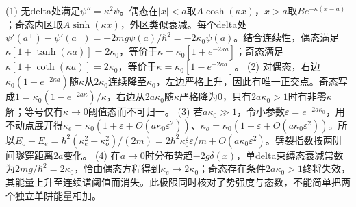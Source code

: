 (1) 无delta处满足\(\psi''=\kappa^2\psi\)。偶态在\(|x|<a\)取\(A\cosh(\kappa x)\)，\(x>a\)取\(Be^{-\kappa(x-a)}\)；奇态内区取\(A\sinh(\kappa x)\)，外区类似衰减。每个delta处\(\psi'(a^+)-\psi'(a^-)=-2mg\psi(a)/\hbar^2=-2\kappa_0\psi(a)\)。结合连续性，偶态满足\(\kappa[1+\tanh(\kappa a)]=2\kappa_0\)，等价于\(\kappa=\kappa_0[1+e^{-2\kappa a}]\)；奇态满足\(\kappa[1+\coth(\kappa a)]=2\kappa_0\)，等价于\(\kappa=\kappa_0[1-e^{-2\kappa a}]\)。
(2) 对偶态，右边\(\kappa_0(1+e^{-2\kappa a})\)随\(\kappa\)从\(2\kappa_0\)连续降至\(\kappa_0\)，左边严格上升，因此有唯一正交点。奇态写成\(1=\kappa_0(1-e^{-2a\kappa})/\kappa\)，右边从\(2a\kappa_0\)随\(\kappa\)严格降为0，只有\(2a\kappa_0>1\)时有非零\(\kappa\)解；等号仅有\(\kappa\to0\)阈值态而不可归一。
(3) 若\(a\kappa_0\gg1\)，令小参数\(\varepsilon=e^{-2a\kappa_0}\)，用不动点展开得\(\kappa_e=\kappa_0(1+\varepsilon+O(a\kappa_0\varepsilon^2))\)、\(\kappa_o=\kappa_0(1-\varepsilon+O(a\kappa_0\varepsilon^2))\)。所以\(E_o-E_e=\hbar^2(\kappa_e^2-\kappa_o^2)/(2m)=2\hbar^2\kappa_0^2\varepsilon/m+O(a\kappa_0\varepsilon^2)\)。劈裂指数按两阱间隧穿距离\(2a\)变化。
(4) 在\(a\to0\)时分布势趋\(-2g\delta(x)\)，单delta束缚态衰减常数为\(2mg/\hbar^2=2\kappa_0\)，恰由偶态方程得到\(\kappa_e\to2\kappa_0\)；奇态存在条件\(2a\kappa_0>1\)终将失效，其能量上升至连续谱阈值而消失。此极限同时核对了势强度与态数，不能简单把两个独立单阱能量相加。
